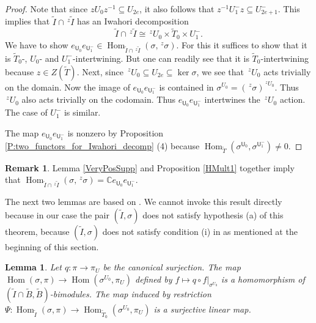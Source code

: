 \documentclass[10pt, letterpaper]{amsart}
\theoremstyle{plain}
\newtheorem{Lem}[equation]{Lemma}
\theoremstyle{definition}
\newtheorem*{Rmk}{Remark}
\numberwithin{equation}{section}
\newcommand{\It}{\widetilde{I}}
\newcommand{\Tt}{\widetilde{T}}
\newcommand{\Hom}{\operatorname{Hom}}
\newcommand{\Uf}{\mathsf{U}}
\begin{document}
\begin{proof}
	Note that since $zU_{0}z^{-1}\subseteq U_{2e}$, it also follows that $z^{-1}U^{-}_{1}z\subseteq U^{-}_{2e+1}$. This implies that $\It\cap\,^{z}\It$ has an Iwahori decomposition
	\begin{equation*}
		\It\cap\,^{z}\It\cong \,^{z}U_{0}\times\Tt_{0}\times U^{-}_{1}.
	\end{equation*} 
	 We have to show $e_{\Uf_{0}}e_{\Uf^{-}_{1}}\in \Hom_{\It\cap\,^{z}\It}(\sigma,\,^{z}\sigma)$. For this it suffices to show that it is $\Tt_{0}$-, $U_0$- and $U_1^-$-intertwining. But one can readily see that it is $\Tt_0$-intertwining because $z\in Z(\Tt)$. Next, since $\,^{z}U_{0}\subseteq U_{2e}\subseteq \ker\sigma$, we see that $\,^{z}U_{0}$ acts trivially on the domain. Now the image of $e_{\Uf_{0}}e_{\Uf^{-}_{1}}$ is contained in $\sigma^{U_{0}}=(\,^{z}\sigma)^{\,^{z}U_{0}}$. Thus $\,^{z}U_{0}$ also acts trivially on the codomain. Thus $e_{\Uf_{0}}e_{\Uf^{-}_{1}}$ intertwines the $\,^{z}U_{0}$ action. The case of $U^{-}_{1}$ is similar.
		
	The map $e_{\Uf_{0}}e_{\Uf^{-}_{1}}$ is nonzero by Proposition \ref{P:two_functors_for_Iwahori_decomp} (4) because $\Hom_{\Tt}(\sigma^{\Uf_0},\sigma^{\Uf_1^-})\neq 0$.
\end{proof}

\begin{Rmk}
    Lemma \ref{VeryPosSupp} and Proposition \ref{HMult1} together imply that $\Hom_{\It\cap\,^{z}\It}(\sigma,\,^{z}\sigma)=\mathbb{C}e_{\Uf_{0}}e_{\Uf^{-}_{1}}$.
\end{Rmk} 

The next two lemmas are based on \cite[(7.9) Theorem]{BK98}. We cannot invoke this result directly because in our case the pair $(\It,\sigma)$ does not satisfy hypothesis (a) of this theorem, because $(\It,\sigma)$ does not satisfy condition (i) in \cite[(6.1) Definition]{BK98} as mentioned at the beginning of this section.

\begin{Lem}\label{LemSurj}
Let $q:\pi\to\pi_U$ be the canonical surjection. The map $\Hom(\sigma,\pi)\rightarrow \Hom(\sigma^{U_{0}},\pi_{U})$ defined by $f\mapsto q\circ f|_{\sigma^{U_{0}}}$ is a homomorphism of $(\It\cap \widetilde{B},\widetilde{B})$-bimodules. The map induced by restriction $\Psi:\Hom_{\It}(\sigma,\pi)\rightarrow \Hom_{\Tt_{0}}(\sigma^{U_{0}},\pi_{U})$ is a surjective linear map.
\end{Lem}
\end{document}
